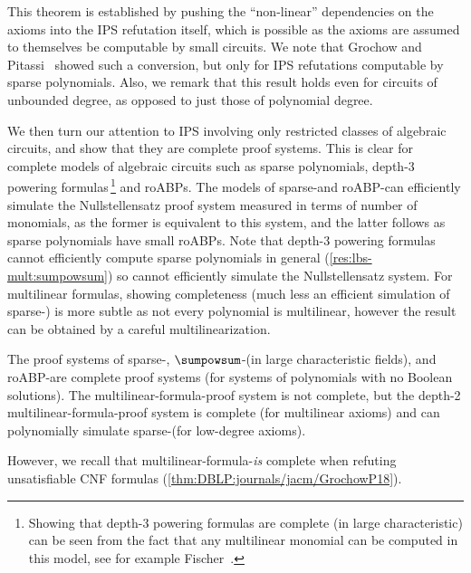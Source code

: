 \documentclass{toc}
\begin{document}
This theorem is established by pushing the ``non-linear'' dependencies on the axioms into the IPS refutation itself, which is possible as the axioms are assumed to themselves be computable by small circuits.  We note that Grochow and Pitassi~\cite{DBLP:journals/jacm/GrochowP18} showed such a conversion, but only for IPS refutations computable by sparse polynomials.  Also, we remark that this result holds even for circuits of unbounded degree, as opposed to just those of polynomial degree.

We then turn our attention to IPS involving only restricted classes of algebraic circuits, and show that they are complete proof systems.  This is clear for complete models of algebraic circuits such as sparse polynomials, depth-3 powering formulas\,\footnote{Showing that depth-3 powering formulas are complete (in large characteristic) can be seen from the fact that any multilinear monomial can be computed in this model, see for example Fischer~\cite{Fischer94}.} and roABPs.  The models of sparse-\lIPS and roABP-\lIPS can efficiently simulate the Nullstellensatz proof system measured in terms of number of monomials, as the former is equivalent to this system, and the latter follows as sparse polynomials have small roABPs.  Note that depth-3 powering formulas cannot efficiently compute sparse polynomials in general (\autoref{res:lbs-mult:sumpowsum}) so cannot efficiently simulate the Nullstellensatz system. For multilinear formulas, showing completeness (much less an efficient simulation of sparse-\lIPS) is more subtle as not every polynomial is multilinear, however the result can be obtained by a careful multilinearization.

\begin{theorem}
        The proof systems of sparse-\lIPS, $\sumpowsum$-\lIPS (in large characteristic fields), and roABP-\lIPS are complete proof systems (for systems of polynomials with no Boolean solutions).  The multilinear-formula-\lIPS proof system is not complete, but the depth-2 multilinear-formula-\lbIPS proof system is complete (for multilinear axioms) and can polynomially simulate sparse-\lIPS (for low-degree axioms).
\end{theorem}

However, we recall that multilinear-formula-\lIPS \emph{is} complete when refuting unsatisfiable CNF formulas (\autoref{thm:DBLP:journals/jacm/GrochowP18}).
\end{document}
